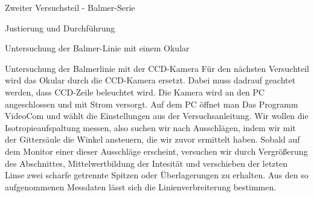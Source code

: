 \documentclass[pdftex, a4paper,11pt, twoside, ngerman]{report}
\begin{document}
\begin{chapter}{Zweiter Versuchsteil - Balmer-Serie}
\begin{section}{Justierung und Durchführung}
\begin{subsection}{Untersuchung der Balmer-Linie mit einem Okular}
      \end{subsection}
     
     
     
      \begin{subsection}{Untersuchung der Balmerlinie mit der CCD-Kamera}
        \label{chp:Balmer:sec:JusitierungDurchfuehrung:subsec:CCD}
        Für den nächsten Versuchteil wird das Okular durch die CCD-Kamera
        ersetzt. Dabei muss dadrauf geachtet werden, dass CCD-Zeile beleuchtet
        wird. Die Kamera wird an den PC angeschlossen und mit Strom versorgt.
        Auf dem PC öffnet man Das Programm VideoCom und wählt die
        Einstellungen aus der Versuchsanleitung. Wir wollen die
        Isotropieaufspaltung messen, also suchen wir nach Ausschlägen, indem
        wir mit der Gittersäule die Winkel ansteuern, die wir zuvor ermittelt
        haben. Sobald auf dem Monitor einer dieser Ausschläge erscheint,
        versuchen wir durch Vergrößerung des Abschnittes, Mittelwertbildung
        der Intesität und verschieben der letzten Linse zwei scharfe getrennte
        Spitzen oder Überlagerungen zu erhalten. Aus den so aufgenommenen
        Messdaten lässt sich die Linienverbreiterung bestimmen.
        

\end{subsection}
\end{section}
\end{chapter}
\end{document}
